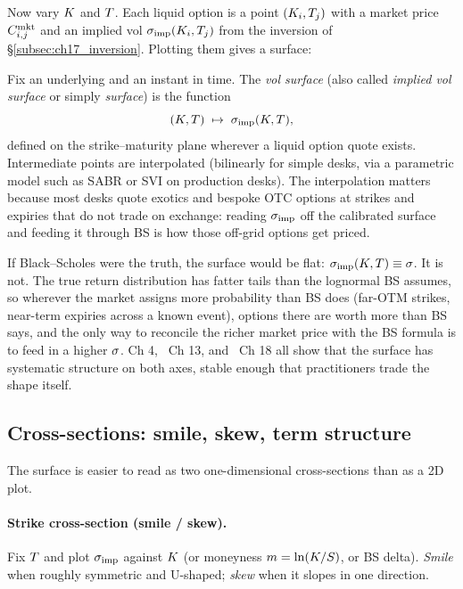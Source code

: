 Now vary $K$ and $T$. Each liquid option is a point
$(K_i, T_j)$ with a market price
$C^{\text{mkt}}_{i,j}$ and an implied vol
$\sigma_{\text{imp}}(K_i, T_j)$ from the inversion of
\S\ref{subsec:ch17_inversion}. Plotting them gives a surface:

\begin{definition}
\label{def:vol_surface}
Fix an underlying and an instant in time. The \emph{vol surface}
(also called \emph{implied vol surface} or simply \emph{surface})
is the function
\begin{equation*}
  (K, T) \;\mapsto\; \sigma_{\text{imp}}(K, T),
\end{equation*}
defined on the strike--maturity plane wherever a liquid option
quote exists. Intermediate points are interpolated (bilinearly for
simple desks, via a parametric model such as SABR or SVI on
production desks). The interpolation matters because most desks
quote exotics and bespoke OTC options at strikes and expiries
that do not trade on exchange: reading $\sigma_{\text{imp}}$ off
the calibrated surface and feeding it through BS is how those
off-grid options get priced.
\end{definition}

If Black--Scholes were the truth, the surface would be flat:
$\sigma_{\text{imp}}(K, T) \equiv \sigma$. It is not.
The true return distribution has fatter tails than the lognormal
BS assumes, so wherever the market assigns more probability than
BS does (far-OTM strikes, near-term expiries across a known
event), options there are worth more than BS says, and the only
way to reconcile the richer market price with the BS formula is
to feed in a higher $\sigma$.
 \citeBennett Ch 4, \citeNatenberg\
Ch 13, and \citeHull\ Ch 18 all show that the surface has systematic
structure on both axes, stable enough that practitioners trade the
shape itself.

\subsection{Cross-sections: smile, skew, term structure}
\label{subsec:ch17_cross_sections}

The surface is easier to read as two one-dimensional cross-sections
than as a 2D plot.

\paragraph{Strike cross-section (smile / skew).}
Fix $T$ and plot $\sigma_{\text{imp}}$ against $K$ (or
moneyness $m = \ln(K/S)$, or BS delta). \emph{Smile}
when roughly symmetric and U-shaped; \emph{skew} when it slopes
in one direction.

